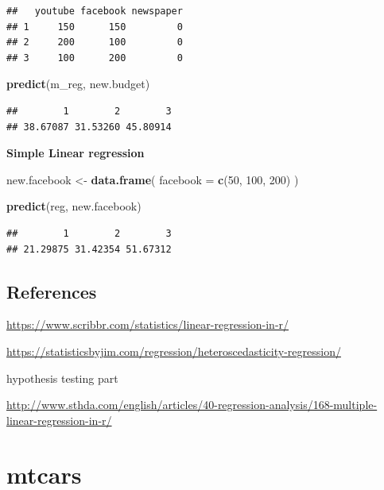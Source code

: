 \documentclass[
]{book}
\newenvironment{Shaded}{\begin{snugshade}}{\end{snugshade}}
\newcommand{\AttributeTok}[1]{\textcolor[rgb]{0.13,0.29,0.53}{#1}}
\newcommand{\DecValTok}[1]{\textcolor[rgb]{0.00,0.00,0.81}{#1}}
\newcommand{\FunctionTok}[1]{\textcolor[rgb]{0.13,0.29,0.53}{\textbf{#1}}}
\newcommand{\NormalTok}[1]{#1}
\newcommand{\OtherTok}[1]{\textcolor[rgb]{0.56,0.35,0.01}{#1}}
\begin{document}
\begin{verbatim}
##   youtube facebook newspaper
## 1     150      150         0
## 2     200      100         0
## 3     100      200         0
\end{verbatim}

\begin{Shaded}
\begin{Highlighting}[]
\FunctionTok{predict}\NormalTok{(m\_reg, new.budget)}
\end{Highlighting}
\end{Shaded}

\begin{verbatim}
##        1        2        3 
## 38.67087 31.53260 45.80914
\end{verbatim}

\textbf{Simple Linear regression}

\begin{Shaded}
\begin{Highlighting}[]
\NormalTok{new.facebook }\OtherTok{\textless{}{-}} \FunctionTok{data.frame}\NormalTok{(}
  \AttributeTok{facebook =} \FunctionTok{c}\NormalTok{(}\DecValTok{50}\NormalTok{, }\DecValTok{100}\NormalTok{, }\DecValTok{200}\NormalTok{)}
\NormalTok{)}

\FunctionTok{predict}\NormalTok{(reg, new.facebook)}
\end{Highlighting}
\end{Shaded}

\begin{verbatim}
##        1        2        3 
## 21.29875 31.42354 51.67312
\end{verbatim}

\newpage

\hypertarget{references-1}{%
\section{References}\label{references-1}}

\url{https://www.scribbr.com/statistics/linear-regression-in-r/}

\url{https://statisticsbyjim.com/regression/heteroscedasticity-regression/}

\newpage

hypothesis testing part

\url{http://www.sthda.com/english/articles/40-regression-analysis/168-multiple-linear-regression-in-r/}

\hypertarget{mtcars}{%
\chapter{mtcars}\label{mtcars}}
\end{document}
